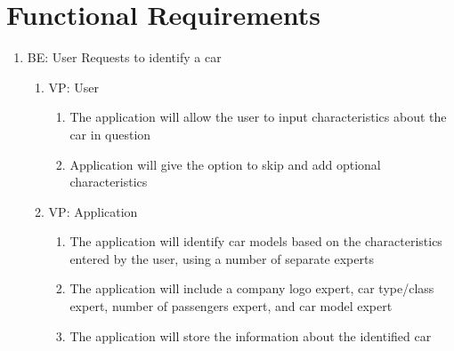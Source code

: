 \documentclass[12pt]{article}
\begin{document}
\section{Functional Requirements}
\begin{enumerate}
    \item BE: User Requests to identify a car
    \begin{enumerate}
        \item VP: User
        \begin{enumerate}
            \item The application will allow the user to input characteristics about the car in question
            \item Application will give the option to skip and add optional characteristics
        \end{enumerate}
        \item VP: Application 
        \begin{enumerate}
            \item The application will identify car models based on the characteristics entered by the user, using a number of separate experts
            \item The application will include a company logo expert, car type/class expert, number of passengers expert, and car model expert
            \item The application will store the information about the identified car


\end{enumerate}
\end{enumerate}
\end{enumerate}
\end{document}
